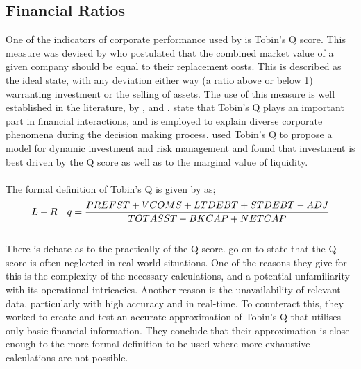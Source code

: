 \subsection{Financial Ratios}
{One of the indicators of corporate performance used by \cite{moldovan2015learning} is Tobin's Q score. This measure was devised by \cite{tobin1969general} who postulated that the combined market value of a given company should be equal to their replacement costs. This is described as the ideal state, with any deviation either way (a ratio above or below 1) warranting investment or the selling of assets. The use of this measure is well established in the literature, by \cite{chung1994simple}, 
\cite{bhagat2008corporate} and \cite{bolton2011unified}. \cite{chung1994simple} state that Tobin's Q plays an important part in financial interactions, and is employed to explain diverse corporate phenomena during the decision making process. \cite{bolton2011unified} used Tobin's Q to propose a model for dynamic investment and risk management and found that investment is best driven by the Q score as well as to the marginal value of liquidity.\\\\
The formal definition of Tobin's Q is given by \cite{chung1994simple} as; 
\begin {equation}\label{TobinQ}
L-R  \quad q = \small {\frac{PREFST + VCOMS + LTDEBT + STDEBT - ADJ}{TOTASST - BKCAP + NETCAP}}
\end{equation}\\
There is debate as to the practically of the Q score. \cite{chung1994simple} go on to state that the Q score is often neglected in real-world situations. One of the reasons they give for this is the complexity of the necessary calculations, and a potential unfamiliarity with its operational intricacies. Another reason is the unavailability of relevant data, particularly with high accuracy and in real-time. To counteract this, they worked to create and test an accurate approximation of Tobin's Q that utilises only basic financial information. They conclude that their approximation is close enough to the more formal definition to be used where more exhaustive calculations are not possible. \\\\
}
